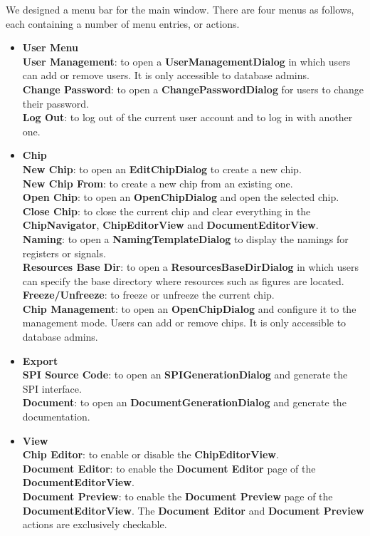 We designed a menu bar for the main window. There are four menus as follows, each containing a number of menu entries, or actions.
\begin{itemize}
\item \textbf{User Menu} \\
\textbf{User Management}: to open a \textbf{UserManagementDialog} in which users can add or remove users. It is only accessible to database admins. \\
\textbf{Change Password}: to open a \textbf{ChangePasswordDialog} for users to change their password. \\
\textbf{Log Out}: to log out of the current user account and to log in with another one. 
\item \textbf{Chip} \\
\textbf{New Chip}: to open an \textbf{EditChipDialog} to create a new chip. \\
\textbf{New Chip From}: to create a new chip from an existing one. \\
\textbf{Open Chip}: to open an \textbf{OpenChipDialog} and open the selected chip. \\
\textbf{Close Chip}: to close the current chip and clear everything in the \textbf{ChipNavigator}, \textbf{ChipEditorView} and \textbf{DocumentEditorView}. \\
\textbf{Naming}: to open a \textbf{NamingTemplateDialog} to display the namings for registers or signals. \\
\textbf{Resources Base Dir}: to open a \textbf{ResourcesBaseDirDialog} in which users can specify the base directory where resources such as figures are located. \\
\textbf{Freeze/Unfreeze}: to freeze or unfreeze the current chip. \\
\textbf{Chip Management}: to open an \textbf{OpenChipDialog} and configure it to the management mode. Users can add or remove chips. It is only accessible to database admins. 
\item \textbf{Export} \\
\textbf{SPI Source Code}: to open an \textbf{SPIGenerationDialog} and generate the SPI interface. \\
\textbf{Document}: to open an \textbf{DocumentGenerationDialog} and generate the documentation. 
\item \textbf{View} \\
\textbf{Chip Editor}: to enable or disable the \textbf{ChipEditorView}. \\
\textbf{Document Editor}: to enable the \textbf{Document Editor} page of the \textbf{DocumentEditorView}. \\
\textbf{Document Preview}: to enable the \textbf{Document Preview} page of the \textbf{DocumentEditorView}. The \textbf{Document Editor} and \textbf{Document Preview} actions are exclusively checkable. 
\end{itemize}

